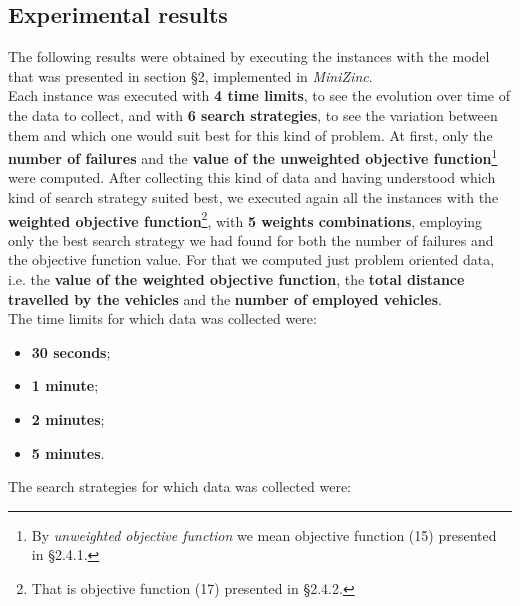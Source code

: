 \documentclass[../main.tex]{subfiles}
\begin{document}
\subsection{Experimental results}
The following results were obtained by executing the instances with the model that was presented in section §2, implemented in \textit{MiniZinc}.\\
Each instance was executed with \textbf{4 time limits}, to see the evolution over time of the data to collect, and with \textbf{6 search strategies}, to see the variation between them and which one would suit best for this kind of problem.
At first, only the \textbf{number of failures} and the \textbf{value of the unweighted objective function}\footnote{By \textit{unweighted objective function} we mean objective function (15) presented in §2.4.1.} were computed.
After collecting this kind of data and having understood which kind of search strategy suited best, we executed again all the instances with the \textbf{weighted objective function}\footnote{That is objective function (17) presented in §2.4.2.}, with \textbf{5 weights combinations}, employing only the best search strategy we had found for both the number of failures and the objective function value.
For that we computed just problem oriented data, i.e. the \textbf{value of the weighted objective function}, the \textbf{total distance travelled by the vehicles} and the \textbf{number of employed vehicles}.\\
The time limits for which data was collected were:
\begin{itemize}
    \item \textbf{30 seconds};
    \item \textbf{1 minute};
    \item \textbf{2 minutes};
    \item \textbf{5 minutes}.
\end{itemize}
The search strategies for which data was collected were:
\end{document}
